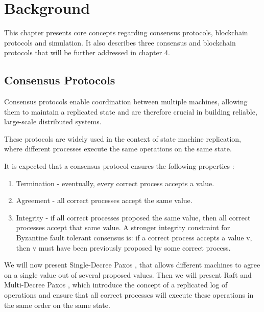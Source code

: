 

\chapter{Background}
\label{cha:background}

\glsresetall

This chapter presents core concepts regarding consensus protocols, blockchain protocols and simulation. It also describes three consensus and blockchain protocols that will be further addressed in chapter 4.


\section{Consensus Protocols}
\label{sec:consensus_protocols}

Consensus protocols enable coordination between multiple machines, allowing them to maintain a replicated state and are therefore crucial in building reliable, large-scale distributed systems.

These protocols are widely used in the context of state machine replication, where different processes execute the same operations on the same state.

It is expected that a consensus protocol ensures the following properties \cite{dist_sys_book}:

\begin{enumerate}
  \item Termination - eventually, every correct process accepts a value.
  \item Agreement - all correct processes accept the same value.
  \item Integrity - if all correct processes proposed the same value, then all correct processes accept that same value. A stronger integrity constraint for Byzantine fault tolerant consensus is: if a correct process accepts a value v, then v must have been previously proposed by some correct process.
\end{enumerate}

We will now present Single-Decree Paxos \cite{paxos_made_simple}, that allows different machines to agree on a single value out of several proposed values. Then we will present  Raft \cite{paxos_vs_raft}\cite{raft} and Multi-Decree Paxos \cite{paxos_vs_raft}\cite{paxos_complex}\cite{paxos_live}, which introduce the concept of a replicated log of operations and ensure that all correct processes will execute these operations in the same order on the same state.


